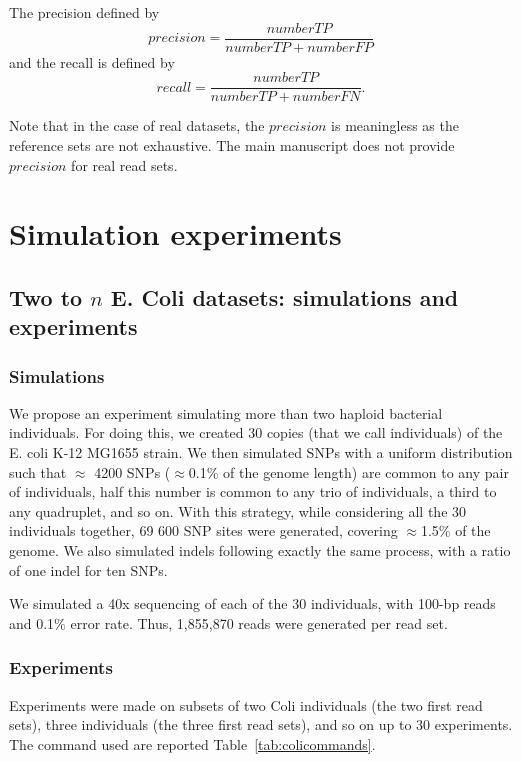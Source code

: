 \documentclass{bmcart}
\begin{document}
The precision defined by $$precision=\frac{number TP}{number TP+ number FP}$$ and the recall is defined by $$recall=\frac{number TP}{number TP+ number FN}.$$

Note that in the case of real datasets, the $precision$ is meaningless as the reference sets are not exhaustive. The main manuscript does not provide $precision$ for real read sets.

\section*{Simulation experiments}


\subsection*{Two to $n$ E. Coli datasets: simulations and experiments}
\subsubsection*{Simulations}
We propose an experiment simulating more than two haploid bacterial individuals. For doing this, we created 30 copies (that we call individuals) of the E. coli K-12 MG1655 strain. We then simulated SNPs with a uniform distribution such that $\approx$ 4200 SNPs ($\approx$0.1\% of the genome length) are common to any pair of individuals, half this number is common to any trio of individuals, a third to any quadruplet, and so on. With this strategy, while considering all the 30 individuals together, 69 600 SNP sites were generated, covering $\approx$1.5\% of the genome. We also simulated indels following exactly the same process, with a ratio of one indel for ten SNPs. 

We simulated a 40x sequencing of each of the 30 individuals, with 100-bp reads and 0.1\% error rate. Thus, 1,855,870 reads were generated per read set. 

\subsubsection*{Experiments}
Experiments were made on subsets of two Coli individuals (the two first read sets), three individuals (the three first read sets), and so on up to 30 experiments. The command used are reported Table~\ref{tab:colicommands}. 
\end{document}
